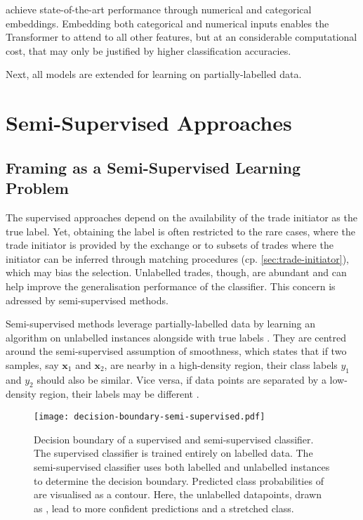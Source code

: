 \textcite[][8]{gorishniyRevisitingDeepLearning2021} achieve state-of-the-art performance through numerical and categorical embeddings. Embedding both categorical and numerical inputs enables the Transformer to attend to all other features, but at an considerable computational cost, that may only be justified by higher classification accuracies.

Next, all models are extended for learning on partially-labelled data.

\newpage
\section{Semi-Supervised Approaches}\label{sec:semi-supervised-approaches}
\subsection{Framing as a Semi-Supervised Learning Problem}\label{sec:problem-framing-2}

The supervised approaches depend on the availability of the trade initiator as the true label. Yet, obtaining the label is often restricted to the rare cases, where the trade initiator is provided by the exchange or to subsets of trades where the initiator can be inferred through matching procedures (cp. \cref{sec:trade-initiator}), which may bias the selection. Unlabelled trades, though, are abundant and can help improve the generalisation performance of the classifier. This concern is adressed by semi-supervised methods.

Semi-supervised methods leverage partially-labelled data by learning an algorithm on unlabelled instances alongside with true labels \autocite[][6]{chapelleSemisupervisedLearning2006}. They are centred around the semi-supervised assumption of smoothness, which states that if two samples, say $\mathbf{x}_{1}$ and $\mathbf{x}_{2}$, are nearby in a high-density region, their class labels $y_{1}$ and $y_{2}$ should also be similar. Vice versa, if data points are separated by a low-density region, their labels may be different \autocite[][5]{chapelleSemisupervisedLearning2006}.

\begin{figure}[h]
    \centering
    \texttt{[image: decision-boundary-semi-supervised.pdf]}
    \caption[Decision Boundary of a Supervised and Semi-Supervised Classifier]{Decision boundary of a supervised and semi-supervised classifier. The supervised classifier is trained entirely on labelled data. The semi-supervised classifier uses both labelled and unlabelled instances to determine the decision boundary. Predicted class probabilities of  are visualised as a contour. Here, the unlabelled datapoints, drawn as , lead to more confident predictions and a stretched class.}
    \label{fig:supervised-semi-supervised}
\end{figure}

